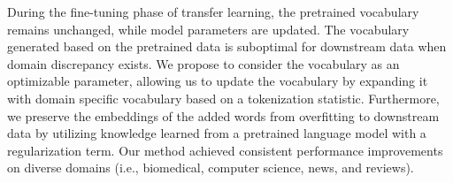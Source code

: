 During the fine-tuning phase of transfer learning, the pretrained vocabulary remains unchanged, while model parameters are updated. The vocabulary generated based on the pretrained data is suboptimal for downstream data when domain discrepancy exists. We propose to consider the vocabulary as an optimizable parameter, allowing us to update the vocabulary by expanding it with domain specific vocabulary based on a tokenization statistic. Furthermore, we preserve the embeddings of the added words from overfitting to downstream data by utilizing knowledge learned from a pretrained language model with a regularization term. Our method achieved consistent performance improvements on diverse domains (i.e., biomedical, computer science, news, and reviews).
